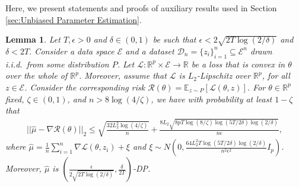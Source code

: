 \documentclass{article}
\newtheorem{lemma}{Lemma}
\newcommand{\iid}{i.i.d.{\ }}
\begin{document}
Here, we present statements and proofs of auxiliary results used in Section \ref{sec:Unbiased Parameter Estimation}.



\begin{lemma}
\label{lemma:Avg_Grad_Priv_GD_vs_AGD}
Let $T, \epsilon > 0$ and $\delta \in (0, 1)$ be such that $\epsilon < 2\sqrt{2T\log(2/\delta)}$ and $\delta < 2T$. Consider a data space $\mathcal{E}$ and a dataset $\mathcal{D}_n = \{z_i\}_{i = 1}^n \subseteq \mathcal{E}^n$ drawn \iid from some distribution $P$. Let $\mathcal{L} : \mathbb{R}^p \times \mathcal{E} \rightarrow \mathbb{R}$ be a loss that is convex in $\theta$ over the whole of $\mathbb{R}^p$. Moreover, assume that $\mathcal{L}$ is $L_2$-Lipschitz over $\mathbb{R}^p$, for all $z \in \mathcal{E}$. Consider the corresponding risk $\mathcal{R(\theta)} = \mathbb{E}_{z \sim P}[\mathcal{L}(\theta, z)]$. For $\theta \in \mathbb{R}^p$ fixed, $\zeta \in (0, 1)$, and $n > 8\log(4/\zeta)$, we have with probability at least $1 - \zeta$ that
\begin{align*}
||\widehat{\mu} - \nabla\mathcal{R}(\theta)||_2 \leq \sqrt{\frac{32L_2^2\log(4/\zeta)}{n}} + \frac{8L_2\sqrt{8pT\log(8/\zeta)\log(5T/2\delta)\log(2/\delta)}}{n\epsilon},
\end{align*}
where $\widehat{\mu} = \frac{1}{n}\sum_{i = 1}^n\nabla \mathcal{L}(\theta, z_i) + \xi$ and $\xi \sim N\left(0, \frac{64L_2^2T\log(5T/2
\delta)\log(2/\delta)}{n^2 \epsilon^2}I_p\right)$. Moreover, $\widehat{\mu}$ is $\left(\frac{\epsilon}{2\sqrt{2T\log(2/\delta)}}, \frac{\delta}{2T}\right)$-DP.
\end{lemma}
\end{document}
